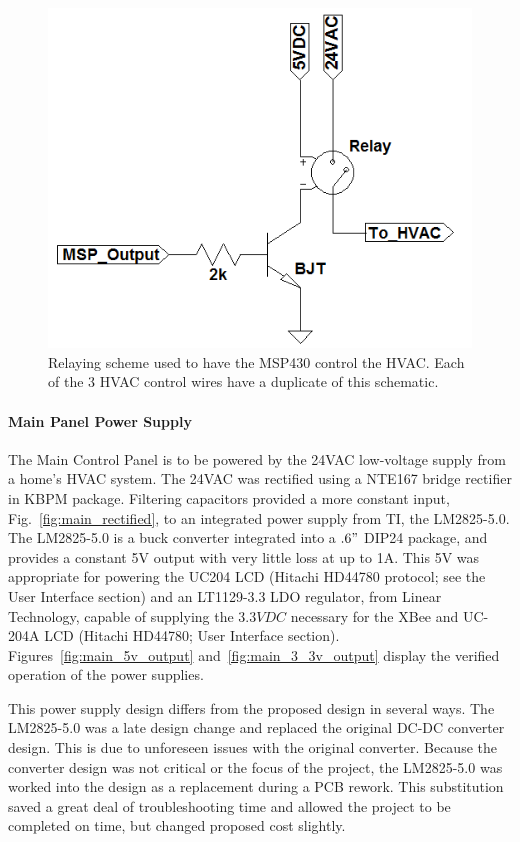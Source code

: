 \begin{figure}[htbp]
\centering
\includegraphics[width=.99\textwidth]{Relay_schem.png}
\caption{Relaying scheme used to have the MSP430 control the HVAC. Each of the 3 HVAC control wires have a duplicate of this schematic.}
\end{figure}

\paragraph{Main Panel Power Supply}
The Main Control Panel is to be powered by the 24VAC low-voltage supply from a home's HVAC system. The 24VAC was rectified using a NTE167 bridge rectifier in KBPM package.  Filtering capacitors provided a more constant input, Fig.~\ref{fig:main_rectified}, to an integrated power supply from TI, the LM2825-5.0.  The LM2825-5.0 is a buck converter integrated into a $.6"$ DIP24 package, and provides a constant 5V output with very little loss at up to 1A.  This 5V was appropriate for powering the UC204 LCD (Hitachi HD44780 protocol; see the User Interface section) and an LT1129-3.3 LDO regulator, from Linear Technology, capable of supplying the $3.3VDC$ necessary for the XBee and UC-204A LCD (Hitachi HD44780; User Interface section). Figures~\ref{fig:main_5v_output} and~\ref{fig:main_3_3v_output} display the verified operation of the power supplies.

This power supply design differs from the proposed design in several ways.  The LM2825-5.0 was a late design change and replaced the original DC-DC converter design.  This is due to unforeseen issues with the original converter.  Because the converter design was not critical or the focus of the project, the LM2825-5.0 was worked into the design as a replacement during a PCB rework.  This substitution saved a great deal of troubleshooting time and allowed the project to be completed on time, but changed proposed cost slightly.

